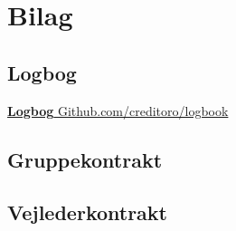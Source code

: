 \section{Bilag}

\subsection{Logbog}
\href{https://github.com/creditoro/logbook}{\textbf{Logbog} Github.com/creditoro/logbook}

\newpage
\subsection{Gruppekontrakt}


\newpage
\subsection{Vejlederkontrakt}


